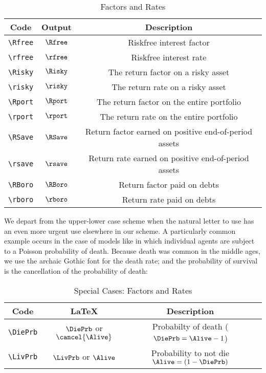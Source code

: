 \documentclass{econark}
\begin{document}
\begin{table}[ht]
  \centering
  \begin{tabular}{|ccc|}
    \hline
    Code    & Output & Description
    \\ \hline
    \verb|\Rfree| & $\Rfree$     & Riskfree interest factor
    \\ \verb|\rfree| & $\rfree$     & Riskfree interest rate
    \\ \verb|\Risky| & $\Risky$     & The return factor on a risky asset
    \\ \verb|\risky| & $\risky$     & The return rate on a risky asset
    \\ \verb|\Rport| & $\Rport$     & The return factor on the entire portfolio
    \\ \verb|\rport| & $\rport$     & The return rate on the entire portfolio
    \\ \verb|\RSave| & $\RSave$     & Return factor earned on positive end-of-period assets
    \\ \verb|\rsave| & $\rsave$     & Return rate earned on positive end-of-period assets
    \\ \verb|\RBoro| & $\RBoro$     & Return factor paid on debts
    \\ \verb|\rboro| & $\rboro$     & Return rate paid on debts
    \\	\hline
  \end{tabular}
  \caption{Factors and Rates}
  \label{table:Factors}
\end{table}

We depart from the upper-lower case scheme when the natural letter to use has an even more urgent use elsewhere in our scheme.
A particularly common example occurs in the case of models like \cite{blanchardFinite} in which
individual agents are subject to a Poisson probability of death.  Because death was common in the
middle ages, we use the archaic Gothic font for the death rate; and the probability of survival is the cancellation of the probability of death:
\begin{table}[ht]
  \centering
  \begin{tabular}{|>{\ttfamily}cccl|}
    \hline
    Code & \LaTeX & Description &  \\
    \hline
    \verb|\DiePrb|     & $\DiePrb$ or $\cancel{\Alive}$    & Probabilty of death ($\DiePrb=\Alive-1$) &
    \\ \verb|\LivPrb|     & $\LivPrb$ or $\Alive$     & Probability to not die $\Alive=(1-\DiePrb)$ &
    \\	\hline
  \end{tabular}
  \caption{Special Cases: Factors and Rates}
  \label{table:SpecialFactors}
\end{table}
\end{document}
